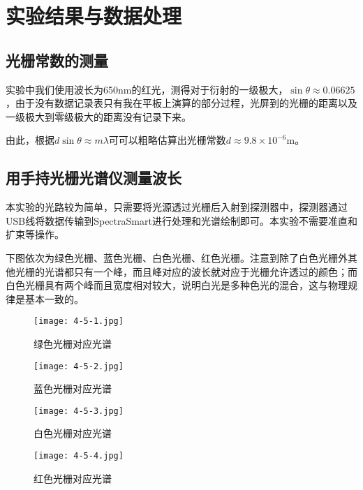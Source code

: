 \documentclass[12pt]{article}
\begin{document}
\section{实验结果与数据处理}
\subsection{光栅常数的测量}
实验中我们使用波长为650nm的红光，测得对于衍射的一级极大，$\sin \theta \approx 0.06625$，由于没有数据记录表只有我在平板上演算的部分过程，光屏到的光栅的距离以及一级极大到零级极大的距离没有记录下来。

由此，根据$d\sin\theta\approx m\lambda$可可以粗略估算出光栅常数$d\approx9.8\times10^{-6}$m。

\subsection{用手持光栅光谱仪测量波长}
本实验的光路较为简单，只需要将光源透过光栅后入射到探测器中，探测器通过USB线将数据传输到SpectraSmart进行处理和光谱绘制即可。本实验不需要准直和扩束等操作。

下图依次为绿色光栅、蓝色光栅、白色光栅、红色光栅。注意到除了白色光栅外其他光栅的光谱都只有一个峰，而且峰对应的波长就对应于光栅允许透过的颜色；而白色光栅具有两个峰而且宽度相对较大，说明白光是多种色光的混合，这与物理规律是基本一致的。

\begin{figure}[htbp]
    \centering
    \begin{minipage}[c]{0.4\textwidth}
        \centering
        \texttt{[image: 4-5-1.jpg]}
        \caption{绿色光栅对应光谱} 
    \end{minipage}
    \qquad\qquad
    \begin{minipage}[c]{0.4\textwidth}
        \centering
        \texttt{[image: 4-5-2.jpg]}
        \caption{蓝色光栅对应光谱} 
    \end{minipage}
\end{figure}

\begin{figure}[htbp]
    \centering
    \begin{minipage}[c]{0.4\textwidth}
        \centering
        \texttt{[image: 4-5-3.jpg]}
        \caption{白色光栅对应光谱} 
    \end{minipage}
    \qquad\qquad
    \begin{minipage}[c]{0.4\textwidth}
        \centering
        \texttt{[image: 4-5-4.jpg]}
        \caption{红色光栅对应光谱} 
    \end{minipage}
\end{figure}
\end{document}
